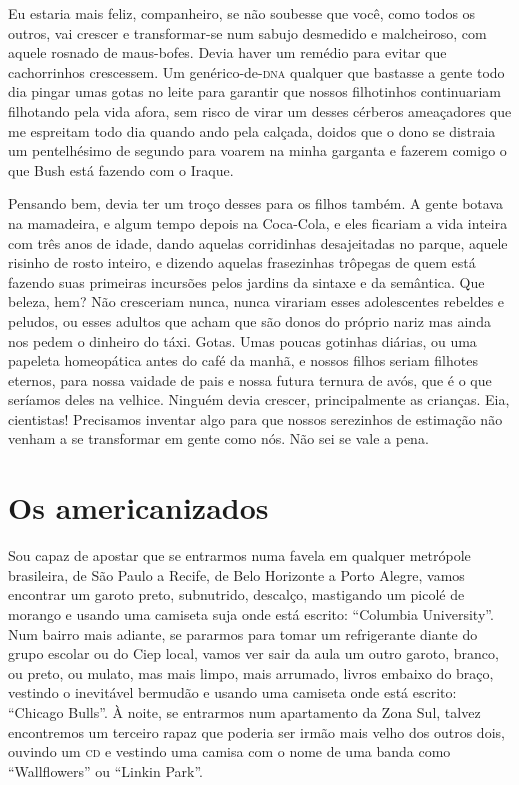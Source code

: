 Eu estaria mais feliz, companheiro, se não soubesse que você, como
todos os outros, vai crescer e transformar-se num sabujo desmedido e
malcheiroso, com aquele rosnado de maus-bofes. Devia haver um remédio
para evitar que cachorrinhos crescessem. Um genérico-de-\textsc{dna} qualquer
que bastasse a gente todo dia pingar umas gotas no leite para
garantir que nossos filhotinhos continuariam filhotando pela vida
afora, sem risco de virar um desses cérberos ameaçadores que me
espreitam todo dia quando ando pela calçada, doidos que o dono se
distraia um pentelhésimo de segundo para voarem na minha garganta e
fazerem comigo o que Bush está fazendo com o Iraque.

Pensando bem, devia ter um troço desses para os filhos também. A gente
botava na mamadeira, e algum tempo depois na Coca-Cola, e eles
ficariam a vida inteira com três anos de idade, dando aquelas
corridinhas desajeitadas no parque, aquele risinho de rosto inteiro,
e dizendo aquelas frasezinhas trôpegas de quem está fazendo suas
primeiras incursões pelos jardins da sintaxe e da semântica. Que
beleza, hem?  Não cresceriam nunca, nunca virariam esses adolescentes
rebeldes e peludos, ou esses adultos que acham que são donos do
próprio nariz mas ainda nos pedem o dinheiro do táxi. Gotas. Umas
poucas gotinhas diárias, ou uma papeleta homeopática antes do café da
manhã, e nossos filhos seriam filhotes eternos, para nossa vaidade de
pais e nossa futura ternura de avós, que é o que seríamos deles na
velhice. Ninguém devia crescer, principalmente as crianças. Eia,
cientistas! Precisamos inventar algo para que nossos serezinhos de
estimação não venham a se transformar em gente como nós. Não sei se
vale a pena.

\chapter{Os americanizados}

Sou capaz de apostar que se entrarmos numa favela em qualquer
metrópole brasileira, de São Paulo a Recife, de Belo Horizonte a
Porto Alegre, vamos encontrar um garoto preto, subnutrido, descalço,
mastigando um picolé de morango e usando uma camiseta suja onde está
escrito: “Columbia University”.  Num bairro mais adiante, se pararmos
para tomar um refrigerante diante do grupo escolar ou do Ciep local,
vamos ver sair da aula um outro garoto, branco, ou preto, ou mulato,
mas mais limpo, mais arrumado, livros embaixo do braço, vestindo o
inevitável bermudão e usando uma camiseta onde está escrito: “Chicago
Bulls”. À noite, se entrarmos num apartamento da Zona Sul, talvez
encontremos um terceiro rapaz que poderia ser irmão mais velho dos
outros dois, ouvindo um \textsc{cd} e vestindo uma camisa com o nome de uma
banda como “Wallflowers” ou “Linkin Park”.

